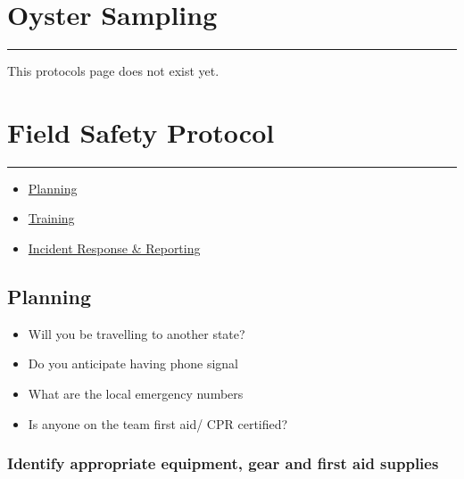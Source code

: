 \documentclass[
  letterpaper,
  DIV=11,
  numbers=noendperiod]{scrreprt}
\begin{document}
\hypertarget{oyster-sampling}{%
\chapter{Oyster Sampling}\label{oyster-sampling}}

\begin{center}\rule{0.5\linewidth}{0.5pt}\end{center}

This protocols page does not exist yet.

\hypertarget{field-safety-protocol}{%
\chapter{Field Safety Protocol}\label{field-safety-protocol}}

\begin{center}\rule{0.5\linewidth}{0.5pt}\end{center}

\begin{itemize}
\item
  \href{https://drk-lo.github.io/lotterhoslabprotocols/field_fieldsafety_protocol/\#planning}{Planning}
\item
  \href{https://drk-lo.github.io/lotterhoslabprotocols/field_fieldsafety_protocol/\#training}{Training}
\item
  \href{https://drk-lo.github.io/lotterhoslabprotocols/field_fieldsafety_protocol/\#emergency-procedures}{Incident
  Response \& Reporting}
\end{itemize}

\hypertarget{planning}{%
\section*{\texorpdfstring{\textbf{Planning}}{Planning}}\label{planning}}


\begin{itemize}
\item
  Will you be travelling to another state?
\item
  Do you anticipate having phone signal
\item
  What are the local emergency numbers
\item
  Is anyone on the team first aid/ CPR certified?
\end{itemize}

\hypertarget{identify-appropriate-equipment-gear-and-first-aid-supplies}{%
\subsection*{\texorpdfstring{\textbf{Identify appropriate equipment,
gear and first aid
supplies}}{Identify appropriate equipment, gear and first aid supplies}}\label{identify-appropriate-equipment-gear-and-first-aid-supplies}}
\end{document}
